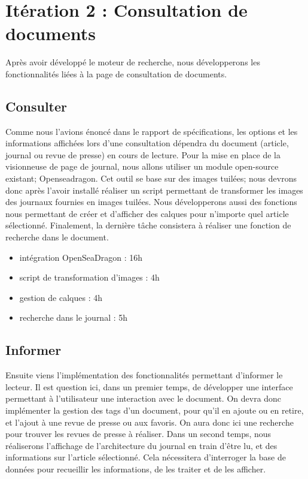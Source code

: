 \section{Itération 2 : Consultation de documents}
\label{sec:consultation}

	Après avoir développé le moteur de recherche, nous développerons les fonctionnalités liées à la page de consultation de documents.

	\subsection{Consulter}
	\label{subsec:consulter}
		Comme nous l'avions énoncé dans le rapport de spécifications, les options et les informations affichées lors d'une consultation dépendra du document (article, journal ou revue de presse) en cours de lecture.
		Pour la mise en place de la visionneuse de page de journal, nous allons utiliser un module open-source existant; Openseadragon. Cet outil se base sur des images tuilées; nous devrons donc après l'avoir installé réaliser un script permettant de transformer les images des journaux fournies en images tuilées. Nous développerons aussi des fonctions nous permettant de créer et d'afficher des calques pour n'importe quel article sélectionné. Finalement, la dernière tâche consistera à réaliser une fonction de recherche dans le document.

		\begin{itemize}
			\item intégration OpenSeaDragon : 16h
			\item script de transformation d'images : 4h
			\item gestion de calques : 4h
			\item recherche dans le journal : 5h
		\end{itemize}


	\subsection{Informer}
	\label{subsec:informer}
		Ensuite viens l'implémentation des fonctionnalités permettant d'informer le lecteur. Il est question ici, dans un premier temps, de développer une interface permettant à l'utilisateur une interaction avec le document. On devra donc implémenter la gestion des tags d'un document, pour qu'il en ajoute ou en retire, et l'ajout à une revue de presse ou aux favoris. On aura donc ici une recherche pour trouver les revues de presse à réaliser. Dans un second temps, nous réaliserons l'affichage de l'architecture du journal en train d'être lu, et des informations sur l'article sélectionné. Cela nécessitera d'interroger la base de données pour recueillir les informations, de les traiter et de les afficher.

